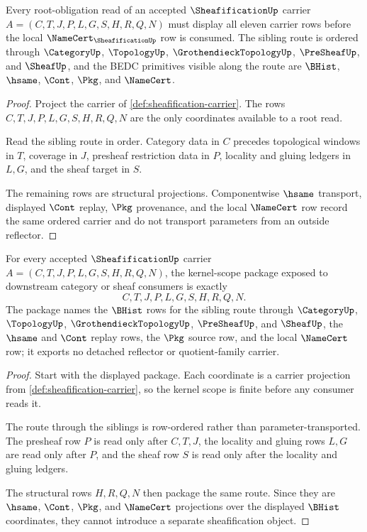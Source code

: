 \begin{theorem}
\label{thm:sheafification-root-obligation-carrier}
Every root-obligation read of an accepted $\SheafificationUp$ carrier $A=(C,T,J,P,L,G,S,H,R,Q,N)$ must display all eleven carrier rows before the local $\NameCert_{\SheafificationUp}$ row is consumed. The sibling route is ordered through $\CategoryUp$, $\TopologyUp$, $\GrothendieckTopologyUp$, $\PreSheafUp$, and $\SheafUp$, and the BEDC primitives visible along the route are $\BHist$, $\hsame$, $\Cont$, $\Pkg$, and $\NameCert$.
\end{theorem}
\begin{proof}
Project the carrier of \autoref{def:sheafification-carrier}. The rows $C,T,J,P,L,G,S,H,R,Q,N$ are the only coordinates available to a root read.

Read the sibling route in order. Category data in $C$ precedes topological windows in $T$, coverage in $J$, presheaf restriction data in $P$, locality and gluing ledgers in $L,G$, and the sheaf target in $S$.

The remaining rows are structural projections. Componentwise $\hsame$ transport, displayed $\Cont$ replay, $\Pkg$ provenance, and the local $\NameCert$ row record the same ordered carrier and do not transport parameters from an outside reflector.
\end{proof}

\begin{theorem}
\label{thm:sheafification-kernel-scope-package}
For every accepted $\SheafificationUp$ carrier $A=(C,T,J,P,L,G,S,H,R,Q,N)$, the kernel-scope package exposed to downstream category or sheaf consumers is exactly
$$
C,T,J,P,L,G,S,H,R,Q,N .
$$
The package names the $\BHist$ rows for the sibling route through $\CategoryUp$, $\TopologyUp$, $\GrothendieckTopologyUp$, $\PreSheafUp$, and $\SheafUp$, the $\hsame$ and $\Cont$ replay rows, the $\Pkg$ source row, and the local $\NameCert$ row; it exports no detached reflector or quotient-family carrier.
\end{theorem}
\begin{proof}
Start with the displayed package. Each coordinate is a carrier projection from \autoref{def:sheafification-carrier}, so the kernel scope is finite before any consumer reads it.

The route through the siblings is row-ordered rather than parameter-transported. The presheaf row $P$ is read only after $C,T,J$, the locality and gluing rows $L,G$ are read only after $P$, and the sheaf row $S$ is read only after the locality and gluing ledgers.

The structural rows $H,R,Q,N$ then package the same route. Since they are $\hsame$, $\Cont$, $\Pkg$, and $\NameCert$ projections over the displayed $\BHist$ coordinates, they cannot introduce a separate sheafification object.
\end{proof}

